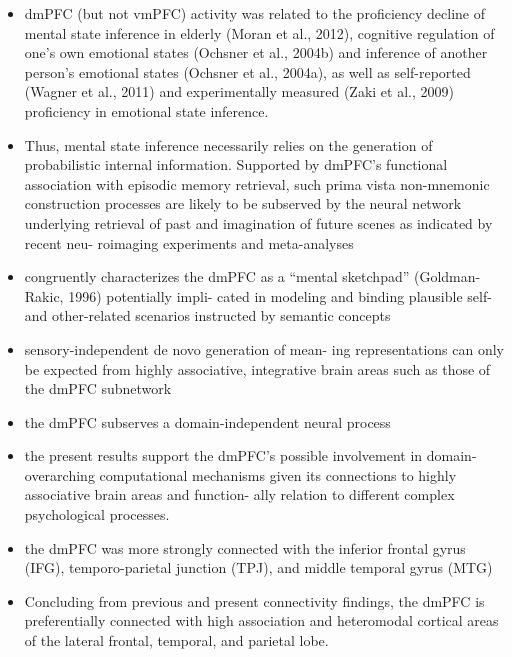 \documentclass{article} %
\begin{document}
\begin{itemize}
\begin{itemize}
\item
 dmPFC (but not vmPFC) activity was related to the proficiency decline of mental state inference in elderly (Moran et al., 2012), cognitive regulation of one’s own emotional states (Ochsner et al., 2004b) and inference of another person’s emotional states (Ochsner et al., 2004a), as well as self-reported (Wagner et al., 2011) and experimentally measured (Zaki et al., 2009) proficiency in emotional state inference.

 \item
Thus, mental state inference necessarily relies on the generation of probabilistic internal information. Supported by dmPFC’s functional association with episodic memory retrieval, such prima vista non-mnemonic construction processes are likely to be subserved by the neural network underlying retrieval of past and imagination of future scenes as indicated by recent neu- roimaging experiments and meta-analyses

\item
congruently characterizes the dmPFC as a “mental sketchpad” (Goldman-Rakic, 1996) potentially impli- cated in modeling and binding plausible self- and other-related scenarios instructed by semantic concepts

\item
 sensory-independent de novo generation of mean- ing representations can only be expected from highly associative, integrative brain areas such as those of the dmPFC subnetwork

\item
the dmPFC subserves a domain-independent neural process

\item
the present results support the dmPFC’s possible involvement in domain-overarching computational mechanisms given its connections to highly associative brain areas and function- ally relation to different complex psychological processes.

\item
the dmPFC was more strongly connected with the inferior frontal gyrus (IFG), temporo-parietal junction (TPJ), and middle temporal gyrus (MTG)

\item
Concluding from previous and present connectivity findings, the dmPFC is preferentially connected with high association and heteromodal cortical areas of the lateral frontal, temporal, and parietal lobe.


\end{itemize}
\end{itemize}
\end{document}
